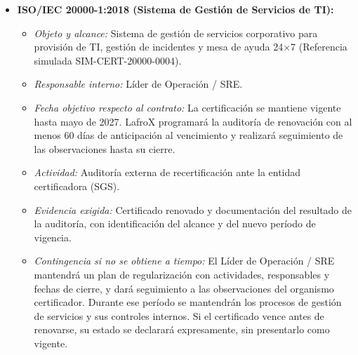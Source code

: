 \begin{itemize}
\begin{itemize}
        \item \textit{Fecha objetivo respecto al contrato:} Vigente hasta enero de 2027. La auditoría externa de renovación se programa y ejecuta con anterioridad al inicio de las actividades contractuales en febrero de 2027 y, en todo caso, antes de la entrega del Hito 1, prevista para el 9 de marzo de 2027 (Formulario T-15).
        \item \textit{Actividad:} Auditoría externa de renovación del SGSI ante el organismo certificador oficial (AENOR).
        \item \textit{Evidencia exigida:} Remisión del certificado renovado o del informe favorable de auditoría externa de renovación ante la Contraparte Técnica en el Hito 1.
        \item \textit{Contingencia si no se obtiene a tiempo:} Activación del régimen de plan de certificación por hitos dentro de los primeros doce meses, expresamente contemplado en las Bases Técnicas Transversales (sección 15.2, pp. 27--28) y las Bases Administrativas (Art. 34, p. 22), garantizando la vigencia operacional continua de todos los controles técnicos de seguridad desde el día 1.
    \end{itemize}
    \item \textbf{ISO/IEC 20000-1:2018 (Sistema de Gestión de Servicios de TI):}
    \begin{itemize}
        \item \textit{Objeto y alcance:} Sistema de gestión de servicios corporativo para provisión de TI, gestión de incidentes y mesa de ayuda 24$\times$7 (Referencia simulada SIM-CERT-20000-0004).
        \item \textit{Responsable interno:} Líder de Operación / SRE.
        \item \textit{Fecha objetivo respecto al contrato:} La certificación se mantiene vigente hasta mayo de 2027. LafroX programará la auditoría de renovación con al menos 60 días de anticipación al vencimiento y realizará seguimiento de las observaciones hasta su cierre.
        \item \textit{Actividad:} Auditoría externa de recertificación ante la entidad certificadora (SGS).
        \item \textit{Evidencia exigida:} Certificado renovado y documentación del resultado de la auditoría, con identificación del alcance y del nuevo período de vigencia.
        \item \textit{Contingencia si no se obtiene a tiempo:} El Líder de Operación / SRE mantendrá un plan de regularización con actividades, responsables y fechas de cierre, y dará seguimiento a las observaciones del organismo certificador. Durante ese período se mantendrán los procesos de gestión de servicios y sus controles internos. Si el certificado vence antes de renovarse, su estado se declarará expresamente, sin presentarlo como vigente.

\end{itemize}
\end{itemize}
